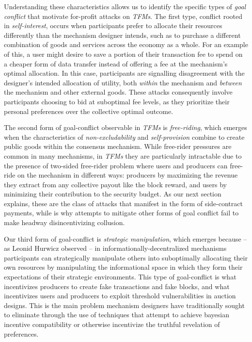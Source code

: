 Understanding these characteristics allows us to identify the specific types of \textit{goal conflict} that motivate for-profit attacks on \textit{TFMs}. The first type, conflict rooted in \textit{self-interest}, occurs when participants prefer to allocate their resources differently than the mechanism designer intends, such as to purchase a different combination of goods and services across the economy as a whole. For an example of this, a user might desire to save a portion of their transaction fee to spend on a cheaper form of data transfer instead of offering a fee at the mechanism's optimal allocation. In this case, participants are signalling disagreement with the designer's intended allocation of utility, both \textit{within} the mechanism and \textit{between} the mechanism and other external goods. These attacks consequently involve participants choosing to bid at suboptimal fee levels, as they prioritize their personal preferences over the collective optimal outcome.

The second form of goal-conflict observable in \textit{TFMs} is \textit{free-riding}, which emerges when the characteristics of \textit{non-excludability} and \textit{self-provision} combine to create public goods within the consensus mechanism. While free-rider pressures are common in many mechanisms, in \textit{TFMs} they are particularly intractable due to the presence of two-sided free-rider problem where users and producers can free-ride on the mechanism in different ways: producers by maximizing the revenue they extract from any collective payout like the block reward, and users by minimizing their contribution to the security budget. As our next section explains, these are the class of attacks that manifest in the form of side-contract payments, while is why attempts to mitigate other forms of goal conflict fail to make headway disincentivizing collusion.

Our third form of goal-conflict is \textit{strategic manipulation}, which emerges because -- as Leonid Hurwicz observed -- in informationally-decentralized mechanisms participants can strategically manipulate others into suboptimally allocating their own resources by manipulating the informational space in which they form their expectations of their strategic environments. This type of goal-conflict is what incentivizes producers to create fake transactions and fake blocks, and what incentivizes users and producers to exploit threshold vulnerabilities in auction designs. This is the main problem mechanism designers have traditionally sought to eliminate through the use of techniques that attempt to achieve bayesian incentive compatibility or otherwise incentivize the truthful revelation of preferences.


